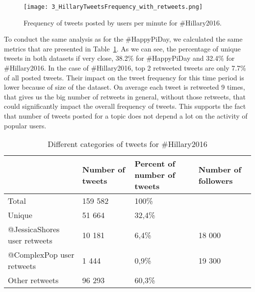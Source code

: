 \documentclass[journal, a4paper, 12pt]{article}
\begin{document}
    
      \begin{figure}[!hbt]
            \begin{center}
            \texttt{[image: 3\_HillaryTweetsFrequency\_with\_retweets.png]}
            \caption{Frequency of tweets posted by users per minute for \#Hillary2016.}
            \label{fig:hillary_freq_tweets}
            \end{center}
      \end{figure}
    
To conduct the same analysis as for the \#HappyPiDay, we calculated the same metrics that are presented in Table~\ref{tab:numberoftweets_hillary}. As we can see, the percentage of unique tweets in both datasets if very close, 38.2\% for \#HappyPiDay and 32.4\% for \#Hillary2016. In the case of \#Hillary2016, top 2 retweeted tweets are only 7.7\% of all posted tweets. Their impact on the tweet frequency for this time period is lower because of size of the dataset. On average each tweet is retweeted 9 times, that gives us the big number of retweets in general, without those retweets, that could significantly impact the overall frequency of tweets. This supports the fact that number of tweets posted for a topic does not depend a lot on the activity of popular users.
      
    \begin{table}[!hbt]
            \begin{center}
            \caption{Different categories of tweets for \#Hillary2016}
            \label{tab:numberoftweets_hillary}
            \begin{tabular}{|p{4cm}|p{2cm}|p{2cm}|p{2cm}|}
                  \hline
                   & Number of tweets & Percent of number of tweets & Number of followers \\
            \hline
                  Total & 159 582 & 100\% & \\
                  \hline
                  Unique & 51 664  &  32,4\%  & \\
                  \hline
                  @JessicaShores user retweets & 10 181 & 6,4\% & 18 000\\
            \hline
            @ComplexPop user retweets & 1 444 & 0,9\% & 19 300\\
                  \hline
            Other retweets & 96 293 & 60,3\% &\\
                  \hline
            \end{tabular}
            \end{center}
      \end{table}
    
\end{document}
